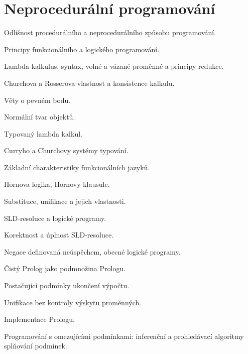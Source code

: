 \newpage
\section{Neprocedurální programování}
\begin{pozadavky}
\begin{pitemize}
\item Odlišnost procedurálního a neprocedurálního způsobu programování.
\item Principy funkcionálního a logického programování.
\item Lambda kalkulus, syntax, volné a vázané proměnné a principy redukce.
\item Churchova a Rosserova vlastnost a konsistence kalkulu.
\item Věty o pevném bodu.
\item Normální tvar objektů.
\item Typovaný lambda kalkul.
\item Curryho a Churchovy systémy typování.
\item Základní charakteristiky funkcionálních jazyků.
\item Hornova logika, Hornovy klausule.
\item Substituce, unifikace a jejich vlastnosti.
\item SLD-resoluce a logické programy.
\item Korektnost a úplnost SLD-resoluce.
\item Negace definovaná neúspěchem, obecné logické programy.
\item Čistý Prolog jako podmnožina Prologu.
\item Postačující podmínky ukončení výpočtu.
\item Unifikace bez kontroly výskytu proměnných.
\item Implementace Prologu.
\item Programování s omezujícími podmínkami: inferenční a prohledávací algoritmy splňování podmínek.
\end{pitemize}
\end{pozadavky}







